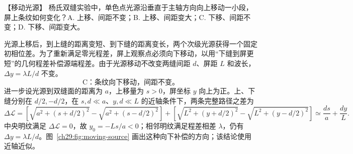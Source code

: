 \begin{origexamplebox}{【移动光源】}\label{ch29:ex:s44-21-1}
杨氏双缝实验中，单色点光源沿垂直于主轴方向向上移动一小段，屏上条纹如何变化？A. 上移、间距不变；B. 上移、间距变大；C. 下移、间距不变；D. 下移、间距变大。

\begin{center}\begin{minipage}{.96\linewidth}\centering
{}
\end{minipage}\end{center}
\end{origexamplebox}\par\nopagebreak[3]
\begin{xesolution}
\MovingSourceDiagram

光源上移后，到上缝的距离变短、到下缝的距离变长，两个次级光源获得一个固定初相位差。为了重新满足零光程差，屏上观察点必须向下移动，以用“下缝到屏更短”的几何程差补偿源端程差。由于光源移动不改变两缝间距 $d$、屏距 $L$ 和波长，$\Delta y=\lambda L/d$ 不变。
\[
 \boxed{\text{C：条纹向下移动，间距不变。}}
\]
进一步设光源到双缝面的距离为 $a$，上移量为 $s>0$，屏坐标 $y$ 向上为正。上、下缝分别在 $d/2,-d/2$，在 $s,d\ll a$、$y,d\ll L$ 的近轴条件下，两条完整路径之差为
\[
 \Delta\mathcal L=
 \left[\sqrt{a^2+(s+d/2)^2}-\sqrt{a^2+(s-d/2)^2}\right]
 +\left[\sqrt{L^2+(y+d/2)^2}-\sqrt{L^2+(y-d/2)^2}\right]
 \simeq\frac{ds}{a}+\frac{dy}{L}.
\]
中央明纹满足 $\Delta\mathcal L=0$，故 $y_0=-Ls/a<0$；相邻明纹满足程差相差 $\lambda$，仍有 $\Delta y=\lambda L/d$。图~\ref{ch29:fig:moving-source} 画出这种向下补偿的方向；该结论使用近轴近似。
\end{xesolution}

